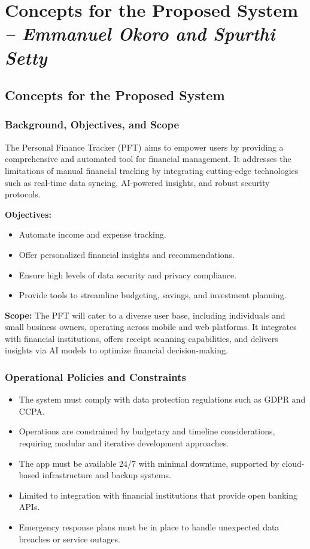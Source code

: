 \chapter{Concepts for the Proposed System \\
\small{\textit{-- Emmanuel Okoro and Spurthi Setty}}
\label{Chapter::Concepts for the Proposed System}}

\section{Concepts for the Proposed System}

\subsection{Background, Objectives, and Scope}
The Personal Finance Tracker (PFT) aims to empower users by providing a comprehensive and automated tool for financial management. It addresses the limitations of manual financial tracking by integrating cutting-edge technologies such as real-time data syncing, AI-powered insights, and robust security protocols.

\textbf{Objectives:}
\begin{itemize}
    \item Automate income and expense tracking.
    \item Offer personalized financial insights and recommendations.
    \item Ensure high levels of data security and privacy compliance.
    \item Provide tools to streamline budgeting, savings, and investment planning.
\end{itemize}

\textbf{Scope:}
The PFT will cater to a diverse user base, including individuals and small business owners, operating across mobile and web platforms. It integrates with financial institutions, offers receipt scanning capabilities, and delivers insights via AI models to optimize financial decision-making.

\subsection{Operational Policies and Constraints}
\begin{itemize}
    \item The system must comply with data protection regulations such as GDPR and CCPA.
    \item Operations are constrained by budgetary and timeline considerations, requiring modular and iterative development approaches.
    \item The app must be available 24/7 with minimal downtime, supported by cloud-based infrastructure and backup systems.
    \item Limited to integration with financial institutions that provide open banking APIs.
    \item Emergency response plans must be in place to handle unexpected data breaches or service outages.
\end{itemize}

